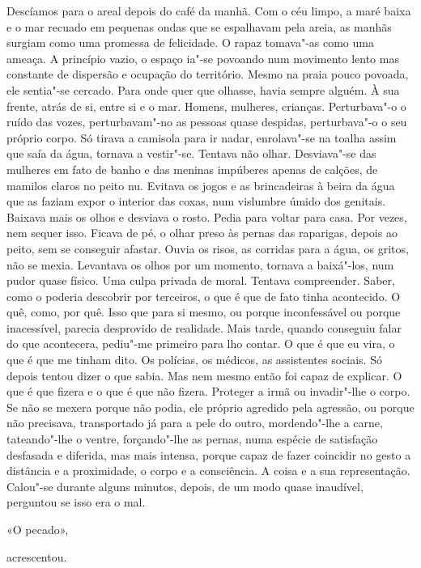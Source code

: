 Descíamos para o areal depois do café da manhã. Com o céu limpo, a
maré baixa e o mar recuado em pequenas ondas que se espalhavam pela
areia, as manhãs surgiam como uma promessa de felicidade. O rapaz
tomava"-as como uma ameaça. A princípio vazio, o espaço ia"-se povoando
num movimento lento mas constante de dispersão e ocupação do território.
Mesmo na praia pouco povoada, ele sentia"-se cercado. Para onde quer que
olhasse, havia sempre alguém. À sua frente, atrás de si, entre si e o
mar. Homens, mulheres, crianças. Perturbava"-o o ruído das vozes,
perturbavam"-no as pessoas quase despidas, perturbava"-o o seu próprio
corpo. Só tirava a camisola para ir nadar, enrolava"-se na toalha assim
que saía da água, tornava a vestir"-se. Tentava não olhar. Desviava"-se
das mulheres em fato de banho e das meninas impúberes apenas de calções,
de mamilos claros no peito nu. Evitava os jogos e as brincadeiras à
beira da água que as faziam expor o interior das coxas, num vislumbre
úmido dos genitais. Baixava mais os olhos e desviava o rosto. Pedia
para voltar para casa. Por vezes, nem sequer isso. Ficava de pé, o olhar
preso às pernas das raparigas, depois ao peito, sem se conseguir
afastar. Ouvia os risos, as corridas para a água, os gritos, não se
mexia. Levantava os olhos por um momento, tornava a baixá"-los, num
pudor quase físico. Uma culpa privada de moral. Tentava compreender.
Saber, como o poderia descobrir por terceiros, o que é que de fato
tinha acontecido. O quê, como, por quê. Isso que para si mesmo, ou porque
inconfessável ou porque inacessível, parecia desprovido de realidade.
Mais tarde, quando conseguiu falar do que acontecera, pediu"-me primeiro
para lho contar. O que é que eu vira, o que é que me tinham dito. Os
polícias, os médicos, as assistentes sociais. Só depois tentou dizer o
que sabia. Mas nem mesmo então foi capaz de explicar. O que é que fizera
e o que é que não fizera. Proteger a irmã ou invadir"-lhe o corpo. Se
não se mexera porque não podia, ele próprio agredido pela agressão, ou
porque não precisava, transportado já para a pele do outro,
mordendo"-lhe a carne, tateando"-lhe o ventre, forçando"-lhe as pernas,
numa espécie de satisfação desfasada e diferida, mas mais intensa,
porque capaz de fazer coincidir no gesto a distância e a proximidade, o
corpo e a consciência. A coisa e a sua representação. Calou"-se durante
alguns minutos, depois, de um modo quase inaudível, perguntou se isso
era o mal.

«O pecado»,

acrescentou.

